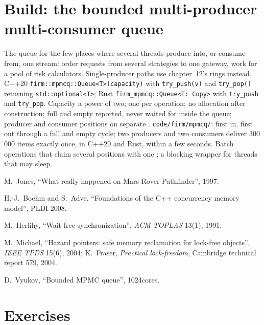 \section{Build: the bounded multi-producer multi-consumer queue}\label{bld:ll:lock-free-programming:mpmcq}

\begin{build}
 The queue for the few places where several threads produce into, or consume from, one stream: order
requests from several strategies to one gateway, work for a pool of risk calculators. Single-producer paths use chapter~12's
rings instead.
 C++20 \texttt{firm::mpmcq::Queue<T>(capacity)} with \texttt{try\_push(v)} and \texttt{try\_pop()} returning
\texttt{std::optional<T>}; Rust \texttt{firm\_mpmcq::Queue<T: Copy>} with \texttt{try\_push} and \texttt{try\_pop}.
 Capacity a power of two; one  per operation; no allocation after construction; full and empty
reported, never waited for inside the queue; producer and consumer positions on separate .
 \texttt{code/firm/mpmcq/}: first in, first out through a full and empty cycle; two producers and two
consumers deliver 300\,000 items exactly once, in C++20 and Rust, within a few seconds.
 Batch operations that claim several positions with one ; a blocking wrapper for threads that
may sleep.
\end{build}

\begin{omsources}
\item M.~Jones, ``What really happened on Mars Rover Pathfinder'', 1997.
\item H.-J.~Boehm and S.~Adve, ``Foundations of the C++ concurrency memory model'', PLDI 2008.
\item M.~Herlihy, ``Wait-free synchronization'', \emph{ACM TOPLAS} 13(1), 1991.
\item M.~Michael, ``Hazard pointers: safe memory reclamation for lock-free objects'', \emph{IEEE TPDS} 15(6), 2004;
K.~Fraser, \emph{Practical lock-freedom}, Cambridge technical report 579, 2004.
\item D.~Vyukov, ``Bounded MPMC queue'', 1024cores.
\end{omsources}

\section{Exercises}

